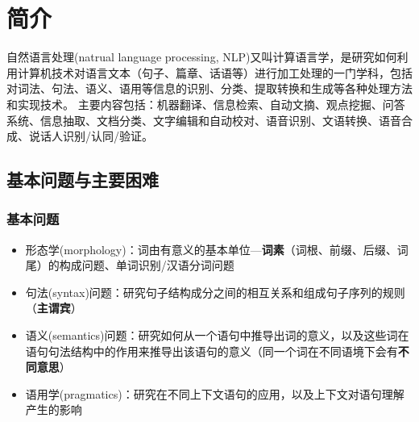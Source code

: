 
\section{简介}
自然语言处理(natrual language processing, NLP)又叫计算语言学，是研究如何利用计算机技术对语言文本（句子、篇章、话语等）进行加工处理的一门学科，包括对词法、句法、语义、语用等信息的识别、分类、提取转换和生成等各种处理方法和实现技术。
主要内容包括：机器翻译、信息检索、自动文摘、观点挖掘、问答系统、信息抽取、文档分类、文字编辑和自动校对、语音识别、文语转换、语音合成、说话人识别/认同/验证。

\subsection{基本问题与主要困难}
\subsubsection{基本问题}
\begin{itemize}
\item 形态学(morphology)：词由有意义的基本单位---\textbf{词素}（词根、前缀、后缀、词尾）的构成问题、单词识别/汉语分词问题
\item 句法(syntax)问题：研究句子结构成分之间的相互关系和组成句子序列的规则（\textbf{主谓宾}）
\item 语义(semantics)问题：研究如何从一个语句中推导出词的意义，以及这些词在语句句法结构中的作用来推导出该语句的意义（同一个词在不同语境下会有\textbf{不同意思}）
\item 语用学(pragmatics)：研究在不同上下文语句的应用，以及上下文对语句理解产生的影响
\end{itemize}

